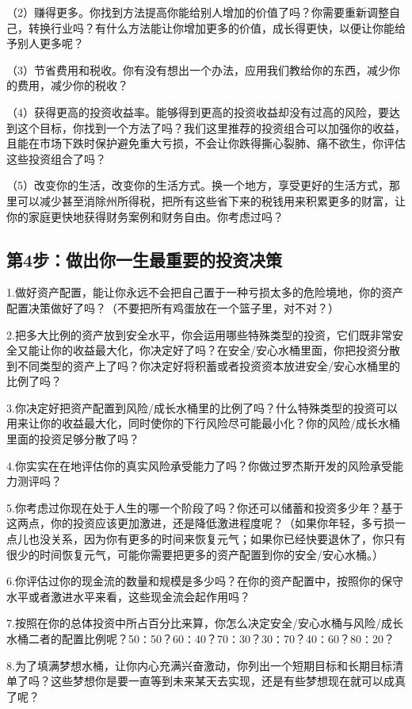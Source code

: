 （2）赚得更多。你找到方法提高你能给别人增加的价值了吗？你需要重新调整自己，转换行业吗？有什么方法能让你增加更多的价值，成长得更快，以便让你能给予别人更多呢？

（3）节省费用和税收。你有没有想出一个办法，应用我们教给你的东西，减少你的费用，减少你的税收？

（4）获得更高的投资收益率。能够得到更高的投资收益却没有过高的风险，要达到这个目标，你找到一个方法了吗？我们这里推荐的投资组合可以加强你的收益，且能在市场下跌时保护避免重大亏损，不会让你跌得撕心裂肺、痛不欲生，你评估这些投资组合了吗？

（5）改变你的生活，改变你的生活方式。换一个地方，享受更好的生活方式，那里可以减少甚至消除州所得税，把所有这些省下来的税钱用来积累更多的财富，让你的家庭更快地获得财务案例和财务自由。你考虑过吗？

\subsection{第4步：做出你一生最重要的投资决策}

1.做好资产配置，能让你永远不会把自己置于一种亏损太多的危险境地，你的资产配置决策做好了吗？（不要把所有鸡蛋放在一个篮子里，对不对？）

2.把多大比例的资产放到安全水平，你会运用哪些特殊类型的投资，它们既非常安全又能让你的收益最大化，你决定好了吗？在安全/安心水桶里面，你把投资分散到不同类型的资产上了吗？你决定好将积蓄或者投资资本放进安全/安心水桶里的比例了吗？

3.你决定好把资产配置到风险/成长水桶里的比例了吗？什么特殊类型的投资可以用来让你的收益最大化，同时使你的下行风险尽可能最小化？你的风险/成长水桶里面的投资足够分散了吗？

4.你实实在在地评估你的真实风险承受能力了吗？你做过罗杰斯开发的风险承受能力测评吗？

5.你考虑过你现在处于人生的哪一个阶段了吗？你还可以储蓄和投资多少年？基于这两点，你的投资应该更加激进，还是降低激进程度呢？（如果你年轻，多亏损一点儿也没关系，因为你有更多的时间来恢复元气；如果你已经快要退休了，你只有很少的时间恢复元气，可能你需要把更多的资产配置到你的安全/安心水桶。）

6.你评估过你的现金流的数量和规模是多少吗？在你的资产配置中，按照你的保守水平或者激进水平来看，这些现金流会起作用吗？

7.按照在你的总体投资中所占百分比来算，你怎么决定安全/安心水桶与风险/成长水桶二者的配置比例呢？50∶50？60∶40？70∶30？30∶70？40∶60？80∶20？

8.为了填满梦想水桶，让你内心充满兴奋激动，你列出一个短期目标和长期目标清单了吗？这些梦想你是要一直等到未来某天去实现，还是有些梦想现在就可以成真了呢？

